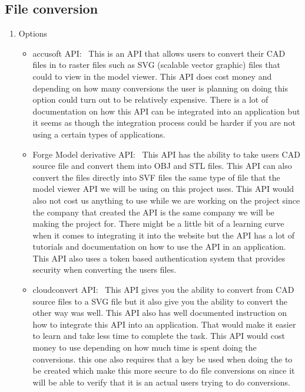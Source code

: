 \documentclass[letterpaper, 10pt, draftclsnofoot, compsoc, onecolumn]{IEEEtran}
\begin{document}
	\subsection{File conversion}
		\begin{enumerate}
			\item{Options}
				\begin{itemize}

					\item accusoft API:~\cite{accusoft2016} This is an API that allows users to convert their CAD files in to raster files such as SVG (scalable vector graphic) files that could 
						to view in the model viewer. This API does cost money and depending on how many conversions the user is planning on doing this option
						could turn out to be relatively expensive. There is a lot of documentation on how this API can be integrated into an application but it seems
						as though the integration process could be harder if you are not using a certain types of applications.

					\item  Forge Model derivative API:~\cite{forge2016} This API has the ability to take users CAD source file and convert them into OBJ and STL files. This API can also
						convert the files directly into SVF files the same type of file that the model viewer API we will be using on this project uses. This API would 
						also not cost us anything to use while we are working on the project since the company that created the API is the same company we will 
						be making the project for. There might be a little bit of a learning curve when it comes to integrating it into the website but the API has a 
						lot of tutorials and documentation on how to use the API in an application.  This API also uses a token based authentication system that
						provides security when converting the users files. 

					\item  cloudconvert API:~\cite{cloudconvert2016} This API gives you the ability to convert from CAD source files to a SVG file but it also give you the ability to convert the 
						other way was well. This API also has well documented instruction on how to integrate this API into an application. That would make it easier
						to learn and take less time to complete the task. This API would cost money to use depending on how much time is spent doing the conversions.
						this one also requires that a key be used when doing the to be created which make this more secure to do file conversions on since it will be able 
						to verify that it is an actual users trying to do conversions. 


\end{itemize}
\end{enumerate}
\end{document}

